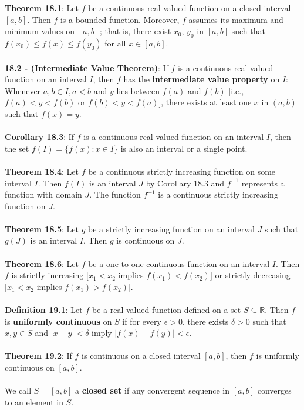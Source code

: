 \documentclass{article}
\theoremstyle{definition}
\begin{document}
\textbf{Theorem 18.1}: Let $f$ be a continuous real-valued function on a closed interval $[a, b]$. Then $f$ is a bounded function. Moreover, $f$ assumes its maximum and minimum values on $[a, b]$; that is, there exist $x_0$, $y_0$ in $[a, b]$ such that $f(x_0) \leq f(x) \leq f(y_0)$ for all $x \in [a, b]$. \\ \\
\textbf{18.2 - (Intermediate Value Theorem)}: If $f$ is a continuous real-valued function on an interval $I$, then $f$ has the \textbf{intermediate value property} on $I$: Whenever $a, b \in I, a < b$ and $y$ lies between $f(a)$ and $f(b)$ [i.e., $f(a) < y < f(b)$ or $f(b) < y < f(a)$], there exists at least one $x$ in $(a, b)$ such that $f(x) = y$. \\ \\
\textbf{Corollary 18.3}: If $f$ is a continuous real-valued function on an interval $I$, then the set $f(I) = \{f(x) : x \in I\}$ is also an interval or a single point. \\ \\
\textbf{Theorem 18.4}: Let $f$ be a continuous strictly increasing function on some interval $I$. Then $f(I)$ is an interval $J$ by Corollary 18.3 and $f^{-1}$ represents a function with domain $J$. The function $f^{-1}$ is a continuous strictly increasing function on $J$. \\ \\
\textbf{Theorem 18.5}: Let $g$ be a strictly increasing function on an interval $J$ such that $g(J)$ is an interval $I$. Then $g$ is continuous on $J$. \\ \\
\textbf{Theorem 18.6}: Let $f$ be a one-to-one continuous function on an interval $I$. Then $f$ is strictly increasing $[x_1 < x_2$ implies $f(x_1) < f(x_2)]$ or strictly decreasing $[x_1 < x_2$ implies $f(x_1) > f(x_2)]$. \\ \\
\textbf{Definition 19.1}: Let $f$ be a real-valued function defined on a set $S \subseteq \mathbb{R}$. Then $f$ is \textbf{uniformly continuous} on $S$ if for every $\epsilon > 0$, there exists $\delta > 0$ such that $x, y \in S$ and $|x - y| < \delta$ imply $|f(x) - f(y)| < \epsilon.$ \\ \\
\textbf{Theorem 19.2}: If $f$ is continuous on a closed interval $[a, b]$, then $f$ is uniformly continuous on $[a, b]$. \\ \\
We call $S = [a, b]$ a \textbf{closed set} if any convergent sequence in $[a, b]$ converges to an element in $S$. \\ \\
\end{document}
